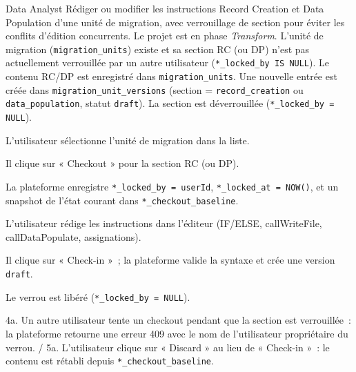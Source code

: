 %
{Data Analyst}%
{Rédiger ou modifier les instructions Record Creation et Data Population d'une unité de migration, avec verrouillage de section pour éviter les conflits d'édition concurrents.}%
{Le projet est en phase \textit{Transform}. L'unité de migration (\texttt{migration\_units}) existe et sa section RC (ou DP) n'est pas actuellement verrouillée par un autre utilisateur (\texttt{*\_locked\_by IS NULL}).}%
{Le contenu RC/DP est enregistré dans \texttt{migration\_units}. Une nouvelle entrée est créée dans \texttt{migration\_unit\_versions} (section = \texttt{record\_creation} ou \texttt{data\_population}, statut \texttt{draft}). La section est déverrouillée (\texttt{*\_locked\_by = NULL}).}%
{%
\item L'utilisateur sélectionne l'unité de migration dans la liste.
\item Il clique sur « Checkout » pour la section RC (ou DP).
\item La plateforme enregistre \texttt{*\_locked\_by = userId}, \texttt{*\_locked\_at = NOW()}, et un snapshot de l'état courant dans \texttt{*\_checkout\_baseline}.
\item L'utilisateur rédige les instructions dans l'éditeur (IF/ELSE, callWriteFile, callDataPopulate, assignations).
\item Il clique sur « Check-in »~; la plateforme valide la syntaxe et crée une version \texttt{draft}.
\item Le verrou est libéré (\texttt{*\_locked\_by = NULL}).
}%
{4a. Un autre utilisateur tente un checkout pendant que la section est verrouillée~: la plateforme retourne une erreur 409 avec le nom de l'utilisateur propriétaire du verrou. / 5a. L'utilisateur clique sur « Discard » au lieu de « Check-in »~: le contenu est rétabli depuis \texttt{*\_checkout\_baseline}.}

